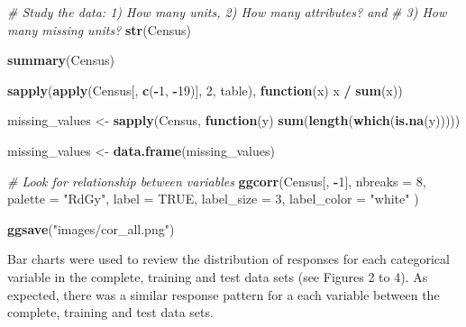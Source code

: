 \documentclass[]{book}
\newenvironment{Shaded}{\begin{snugshade}}{\end{snugshade}}
\newcommand{\KeywordTok}[1]{\textcolor[rgb]{0.13,0.29,0.53}{\textbf{#1}}}
\newcommand{\DataTypeTok}[1]{\textcolor[rgb]{0.13,0.29,0.53}{#1}}
\newcommand{\DecValTok}[1]{\textcolor[rgb]{0.00,0.00,0.81}{#1}}
\newcommand{\StringTok}[1]{\textcolor[rgb]{0.31,0.60,0.02}{#1}}
\newcommand{\CommentTok}[1]{\textcolor[rgb]{0.56,0.35,0.01}{\textit{#1}}}
\newcommand{\OtherTok}[1]{\textcolor[rgb]{0.56,0.35,0.01}{#1}}
\newcommand{\ControlFlowTok}[1]{\textcolor[rgb]{0.13,0.29,0.53}{\textbf{#1}}}
\newcommand{\OperatorTok}[1]{\textcolor[rgb]{0.81,0.36,0.00}{\textbf{#1}}}
\newcommand{\NormalTok}[1]{#1}
\begin{document}
\begin{Shaded}
\begin{Highlighting}[]
\CommentTok{# Study the data: 1) How many units, 2) How many attributes? and }
\CommentTok{# 3) How many missing units?}
\KeywordTok{str}\NormalTok{(Census)}

\KeywordTok{summary}\NormalTok{(Census)}

\KeywordTok{sapply}\NormalTok{(}\KeywordTok{apply}\NormalTok{(Census[, }\KeywordTok{c}\NormalTok{(}\OperatorTok{-}\DecValTok{1}\NormalTok{, }\OperatorTok{-}\DecValTok{19}\NormalTok{)], }\DecValTok{2}\NormalTok{, table), }\ControlFlowTok{function}\NormalTok{(x) x }\OperatorTok{/}\StringTok{ }\KeywordTok{sum}\NormalTok{(x))}

\NormalTok{missing_values <-}\StringTok{ }\KeywordTok{sapply}\NormalTok{(Census, }\ControlFlowTok{function}\NormalTok{(y) }\KeywordTok{sum}\NormalTok{(}\KeywordTok{length}\NormalTok{(}\KeywordTok{which}\NormalTok{(}\KeywordTok{is.na}\NormalTok{(y)))))}

\NormalTok{missing_values <-}\StringTok{ }\KeywordTok{data.frame}\NormalTok{(missing_values)}

\CommentTok{# Look for relationship between variables}
\KeywordTok{ggcorr}\NormalTok{(Census[, }\OperatorTok{-}\DecValTok{1}\NormalTok{],}
       \DataTypeTok{nbreaks =} \DecValTok{8}\NormalTok{, }\DataTypeTok{palette =} \StringTok{"RdGy"}\NormalTok{,}
       \DataTypeTok{label =} \OtherTok{TRUE}\NormalTok{, }\DataTypeTok{label_size =} \DecValTok{3}\NormalTok{, }\DataTypeTok{label_color =} \StringTok{"white"}
\NormalTok{)}

\KeywordTok{ggsave}\NormalTok{(}\StringTok{"images/cor_all.png"}\NormalTok{)}
\end{Highlighting}
\end{Shaded}

Bar charts were used to review the distribution of responses for each
categorical variable in the complete, training and test data sets (see
Figures 2 to 4). As expected, there was a similar response pattern for a
each variable between the complete, training and test data sets.
\end{document}
